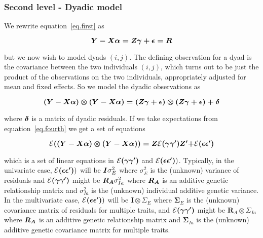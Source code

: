 \documentclass[titlepage]{article}  %
\begin{document}
\subsubsection{Second level - Dyadic model}
\label{sec:dm}
We  rewrite equation~\ref{eq.first} as 

\begin{equation}
\mbox{\boldmath $Y - X \alpha = Z \gamma + \epsilon = R$}  \label{eq.third}
\end{equation}

but we now wish to model dyads $(i,j)$. The defining observation for a dyad is the covariance between the two individuals $(i,j)$, which turns out to be just the product of the observations on the two individuals, appropriately adjusted for mean and fixed effects. So we model the dyadic observations as 

\begin{equation}
\mbox{\boldmath $(Y - X \alpha)\otimes(Y - X \alpha) = (Z \gamma + \epsilon)\otimes(Z \gamma + \epsilon) + \delta$}    \label{eq.fourth}
\end{equation}

where $\mbox{\boldmath $\delta$}$ is a matrix of dyadic residuals. If we take expectations from equation~\ref{eq.fourth} we get a set of equations

\begin{equation}
{\cal E}\mbox{\boldmath $((Y - X \alpha)\otimes(Y - X \alpha)) = Z$}{\cal E}\mbox{\boldmath $(\gamma \gamma^{\prime})Z^{\prime} + $} {\cal E}\mbox{\boldmath $(\epsilon \epsilon^{\prime})$}        \label{eq.fifth}
\end{equation}

which is a set of linear equations in ${\cal E}\mbox{\boldmath $(\gamma \gamma^{\prime})$}$ and ${\cal E}\mbox{\boldmath $(\epsilon \epsilon^{\prime})$})$. Typically, in the univariate case,  ${\cal E}\mbox{\boldmath $(\epsilon \epsilon^{\prime})$})$ will be $\mbox{\boldmath $I$} \sigma^{2}_{E}$ where $\sigma^{2}_{E}$ is the (unknown) variance of residuals and ${\cal E}\mbox{\boldmath $(\gamma \gamma^{\prime})$}$ might be $\mbox{\boldmath $R_{A}$} \sigma^{2}_{Ia}$ where $\mbox{\boldmath $R_{A}$}$ is an additive genetic relationship matrix and $\sigma^{2}_{Ia}$ is the (unknown) individual additive genetic variance. In the multivariate case, ${\cal E}\mbox{\boldmath $(\epsilon \epsilon^{\prime})$})$ will be ${\bm I \otimes \Sigma_{E}}$ where ${\bm \Sigma_{E}}$ is the (unknown) covariance matrix of residuals for multiple traits, and ${\cal E}\mbox{\boldmath $(\gamma \gamma^{\prime})$}$ might be ${\bm R_{A} \otimes \Sigma_{Ia}}$ where $\mbox{\boldmath $R_{A}$}$ is an additive genetic relationship matrix and ${\bm \Sigma_{Ia}}$ is the (unknown) additive genetic covariance matrix for multiple traits.
\end{document}
